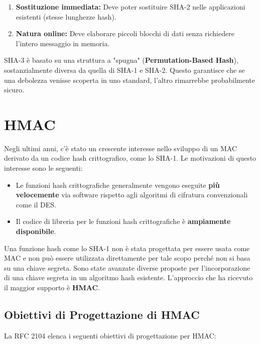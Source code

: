 \documentclass{article}
\begin{document}
\begin{enumerate}
    \item \textbf{Sostituzione immediata:} Deve poter sostituire SHA-2 nelle applicazioni esistenti (stesse lunghezze hash).
    \item \textbf{Natura online:} Deve elaborare piccoli blocchi di dati senza richiedere l'intero messaggio in memoria.
\end{enumerate}

SHA-3 è basato su una struttura a "spugna" (\textbf{Permutation-Based Hash}), sostanzialmente diversa da quella di SHA-1 e SHA-2. Questo garantisce che se una debolezza venisse scoperta in uno standard, l'altro rimarrebbe probabilmente sicuro.

\vspace{0.8cm}

\section*{HMAC}

Negli ultimi anni, c'è stato un crescente interesse nello sviluppo di un MAC derivato da un codice hash crittografico, come lo SHA-1. Le motivazioni di questo interesse sono le seguenti:

\begin{itemize}
    \item Le funzioni hash crittografiche generalmente vengono eseguite \textbf{più velocemente} via software rispetto agli algoritmi di cifratura convenzionali come il DES.
    \item Il codice di libreria per le funzioni hash crittografiche è \textbf{ampiamente disponibile}.
\end{itemize}

Una funzione hash come lo SHA-1 non è stata progettata per essere usata come MAC e non può essere utilizzata direttamente per tale scopo perché non si basa su una chiave segreta. Sono state avanzate diverse proposte per l'incorporazione di una chiave segreta in un algoritmo hash esistente. L'approccio che ha ricevuto il maggior supporto è \textbf{HMAC}.

\vspace{0.5cm}

\subsection*{Obiettivi di Progettazione di HMAC}

La RFC 2104 elenca i seguenti obiettivi di progettazione per HMAC:
\end{document}
